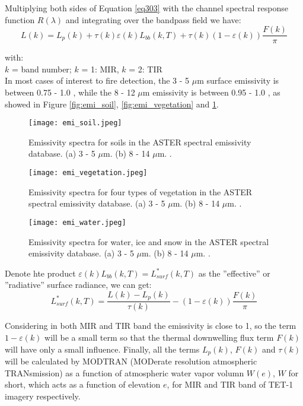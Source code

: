 \noindent Multiplying both sides of Equation \eqref{eq303} with the channel spectral response function $R(\lambda)$ and integrating over the bandpass field we have:
\begin{equation}
\label{eq304}
L(k) = L_p(k) + \tau (k) \varepsilon (k) L_{bb}(k, T) + \tau (k) (1 - \varepsilon (k)) \frac{F(k)}{\pi}
\end{equation}

\noindent with:\\
\indent $k$ = band number; $k$ = 1: MIR, $k$ = 2: TIR\\

In most cases of interest to fire detection, the 3 - 5 $\mu$m surface emissivity is between 0.75 - 1.0 \parencite{Reference301}, while the 8 - 12 $\mu$m emissivity is between 0.95 - 1.0 \parencite{Reference302}, as showed in Figure \ref{fig:emi_soil}, \ref{fig:emi_vegetation} and \ref{fig:emi_water}.\\

\begin{figure}[!htbp]
  \centering\texttt{[image: emi\_soil.jpeg]}
  \caption{Emissivity spectra for soils in the ASTER spectral emissivity database. (a) 3 - 5 $\mu$m. (b) 8 - 14 $\mu$m. \parencite{Reference303}.}
  \label{fig:emi_soil}
  
  \centering\texttt{[image: emi\_vegetation.jpeg]}
  \caption{Emissivity spectra for four types of vegetation in the ASTER spectral emissivity database. (a) 3 - 5 $\mu$m. (b) 8 - 14 $\mu$m. \parencite{Reference303}.}
  \label{fig:emi_vegetation}
  
  \centering\texttt{[image: emi\_water.jpeg]}
  \caption{Emissivity spectra for water, ice and snow in the ASTER spectral emissivity database. (a) 3 - 5 $\mu$m. (b) 8 - 14 $\mu$m. \parencite{Reference303}.}
  \label{fig:emi_water}
\end{figure}

\noindent Denote hte product $\varepsilon(k) L_{bb}(k, T) = L_{surf}^*(k, T)$ as the ''effective'' or ''radiative'' surface radiance, we can get:
\begin{equation}
\label{eq305}
L_{surf}^*(k, T) = \frac{L(k) - L_p(k)}{\tau (k)} - (1 - \varepsilon (k)) \frac{F(k)}{\pi}
\end{equation}

\noindent Considering in both MIR and TIR band the emissivity is close to 1, so the term $1 - \varepsilon (k)$ will be a small term so that the thermal downwelling flux term $F(k)$ will have only a small influence. Finally, all the terms $L_p(k)$, $F(k)$ and $\tau (k)$ will be calculated by MODTRAN (MODerate resolution atmospheric TRANsmission) as a function of atmospheric water vapor volumn $W(e)$, $W$ for short, which acts as a function of elevation $e$, for MIR and TIR band of TET-1 imagery respectively.\\

